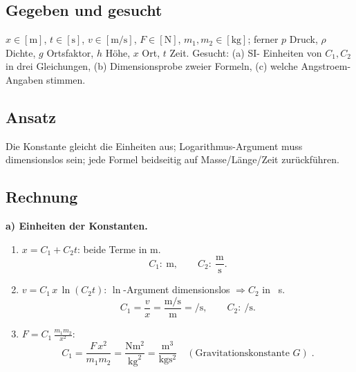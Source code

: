 
\subsection*{Gegeben und gesucht}
$x\in[\mathrm m]$, $t\in[\mathrm s]$, $v\in[\mathrm{m/s}]$,
$F\in[\mathrm N]$, $m_1,m_2\in[\mathrm{kg}]$; ferner $p$ Druck, $\rho$
Dichte, $g$ Ortsfaktor, $h$ H\"ohe, $x$ Ort, $t$ Zeit. Gesucht: (a) SI-
Einheiten von $C_1,C_2$ in drei Gleichungen, (b) Dimensionsprobe zweier
Formeln, (c) welche Angstroem-Angaben stimmen.

\subsection*{Ansatz}
Die Konstante gleicht die Einheiten aus; Logarithmus-Argument muss
dimensionslos sein; jede Formel beidseitig auf Masse/Länge/Zeit zurückführen.

\subsection*{Rechnung}
\textbf{a) Einheiten der Konstanten.}
\begin{enumerate}
  \item[(i)] $x=C_1+C_2t$: beide Terme in \unit{\metre}.
\begin{equation}
  C_1:\ \unit{\metre},\qquad
  C_2:\ \frac{\unit{\metre}}{\unit{\second}}.
\end{equation}
  \item[(ii)] $v=C_1\,x\,\ln(C_2t)$: $\ln$-Argument dimensionslos
        $\Rightarrow C_2$ in \unit{\per\second}.
\begin{equation}
  C_1=\frac{v}{x}=\frac{\unit{\metre\per\second}}{\unit{\metre}}
      =\unit{\per\second},\qquad
  C_2:\ \unit{\per\second}.
\end{equation}
  \item[(iii)] $F=C_1\,\frac{m_1m_2}{x^2}$:
\begin{equation}
  C_1=\frac{F\,x^2}{m_1m_2}
      =\frac{\unit{\newton\metre\squared}}{\unit{\kilogram\squared}}
      =\frac{\unit{\metre\cubed}}{\unit{\kilogram\second\squared}}
      \quad(\text{Gravitationskonstante }G)\;.
\end{equation}
\end{enumerate}

